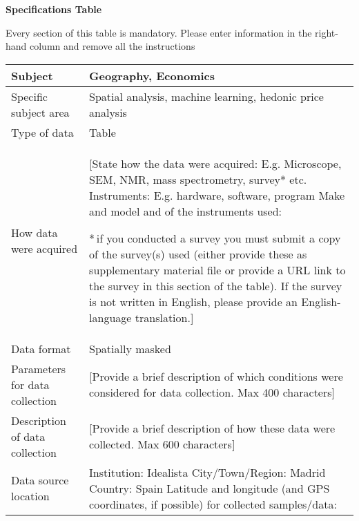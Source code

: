 \documentclass[times,final]{elsarticle}
\begin{document}
{\fontsize{7.5pt}{9pt}\selectfont
\noindent\textbf{Specifications Table}

Every section of this table is mandatory.
Please enter information in the right-hand column and remove all the instructions
\begin{longtable}{|p{33mm}|p{94mm}|}
\hline
\endhead
\hline
\endfoot
Subject                & Geography, Economics\\
\hline
Specific subject area  & Spatial analysis, machine learning, hedonic price analysis\\
\hline
Type of data           & Table\newline\\
How data were acquired & [State how the data were acquired: E.g. Microscope,
                         SEM, NMR, mass spectrometry, survey* etc.\newline
                         Instruments: E.g. hardware, software, program\newline
                         Make and model and of the instruments used:\newline

                         {\fontsize{7pt}{8pt}\selectfont
                         *\,if you conducted a survey you must submit a copy of the
                         survey(s) used (either provide these as supplementary material
                         file or provide a URL link to the survey
                         in this section of the table).
                         If the survey is not written in English,
                         please provide an English-language translation.}]\\
\hline
Data format            & Spatially masked\\
\hline
Parameters for
data\newline
collection             & [Provide a brief description of which conditions were considered
                         for data collection. Max 400 characters]\\

\hline
Description of
data\newline
collection             & [Provide a brief description of how these data were collected.
                         Max 600 characters]\\
\hline
Data source location   & Institution: Idealista\newline
                         City/Town/Region: Madrid\newline
                         Country: Spain\newline
                         Latitude and longitude (and GPS coordinates, if possible) for collected samples/data:\newline



\end{longtable}}
\end{document}
